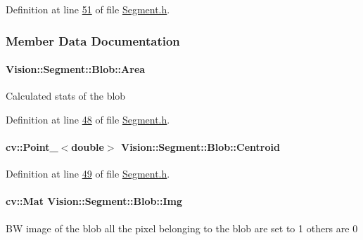 Definition at line \hyperlink{_segment_8h_source_l00051}{51} of file \hyperlink{_segment_8h_source}{Segment.\+h}.



\subsubsection{Member Data Documentation}
\hypertarget{struct_vision_1_1_segment_1_1_blob_a391697e1f49d65415c6c0ed8c3221a74}{}
\paragraph[{Area}]{ Vision\+::\+Segment\+::\+Blob\+::\+Area}\label{struct_vision_1_1_segment_1_1_blob_a391697e1f49d65415c6c0ed8c3221a74}
Calculated stats of the blob 

Definition at line \hyperlink{_segment_8h_source_l00048}{48} of file \hyperlink{_segment_8h_source}{Segment.\+h}.

\hypertarget{struct_vision_1_1_segment_1_1_blob_ac8a647379e87cd42d666edf835862611}{}
\paragraph[{Centroid}]{\setlength{\rightskip}{0pt plus 5cm}cv\+::\+Point\+\_\+$<$double$>$ Vision\+::\+Segment\+::\+Blob\+::\+Centroid}\label{struct_vision_1_1_segment_1_1_blob_ac8a647379e87cd42d666edf835862611}


Definition at line \hyperlink{_segment_8h_source_l00049}{49} of file \hyperlink{_segment_8h_source}{Segment.\+h}.

\hypertarget{struct_vision_1_1_segment_1_1_blob_a776f587282c775375052461a14b0a304}{}
\paragraph[{Img}]{\setlength{\rightskip}{0pt plus 5cm}cv\+::\+Mat Vision\+::\+Segment\+::\+Blob\+::\+Img}\label{struct_vision_1_1_segment_1_1_blob_a776f587282c775375052461a14b0a304}
B\+W image of the blob all the pixel belonging to the blob are set to 1 others are 0 

